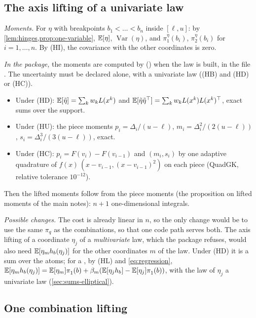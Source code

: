 \documentclass[11pt,a4paper]{article}
\numberwithin{equation}{section}
\newcommand{\hinge}[1]{h_{#1}}          %
\newcommand{\slt}[2]{\pi^{#1}_{#2}}      %
\newcommand{\Var}{\operatorname{Var}}
\newcommand{\Hyp}[1]{\textup{(H#1)}}    %
\begin{document}
\subsection{The axis lifting of a univariate law}
\label{sec:axis}

\emph{Moments.} For $\eta$ with breakpoints $b_1 < \dots < b_n$ inside $[\ell, u]$:
by \cref{lem:hinges,prop:one-variable}, $\mathbb{E}[\eta]$, $\Var(\eta)$, and $\slt\eta1(b_i)$, $\slt\eta2(b_i)$ for $i = 1, \dots, n$.
By \Hyp{I}, the covariance with the other coordinates is zero.

\emph{In the package,} the moments are computed by  ()
when the law  is built, in the file
.
The uncertainty must be declared alone, with a univariate law (\Hyp{B} and \Hyp{D} or \Hyp{C}).
\begin{itemize}[nosep]
\item Under \Hyp{D}: $\mathbb{E}[\tilde\eta] = \sum_k w_kL(x^k)$ and $\mathbb{E}[\tilde\eta\tilde\eta^\top] = \sum_k w_kL(x^k)L(x^k)^\top$, exact sums over the support.
\item Under \Hyp{U}: the piece moments $p_i = \Delta_i/(u - \ell)$, $m_i = \Delta_i^2/(2(u - \ell))$, $s_i = \Delta_i^3/(3(u - \ell))$, exact.
\item Under \Hyp{C}: $p_i = F(v_i) - F(v_{i-1})$ and $(m_i, s_i)$ by one adaptive quadrature of $f(x)\,(x - v_{i-1}, (x - v_{i-1})^2)$ on each piece (QuadGK, relative tolerance $10^{-12}$).
\end{itemize}
Then the lifted moments follow from the piece moments (the proposition on lifted moments of the main notes): $n + 1$ one-dimensional integrals.

\emph{Possible changes.} The cost is already linear in $n$, so the only change would be to use the same $\slt{}q$ as the combinations, so that one code path serves both.
The axis lifting of a coordinate $\eta_j$ of a \emph{multivariate} law, which the package refuses, would also need $\E[\eta_m\hinge b(\eta_j)]$ for the other coordinates $m$ of the law.
Under \Hyp{D} it is a sum over the atoms; for a , by \Hyp{L} and \eqref{eq:regression},
$\E[\eta_m\hinge b(\eta_j)] = \E[\eta_m]\slt{}1(b) + \beta_m(\E[\eta_j\hinge b] - \E[\eta_j]\slt{}1(b))$,
with the law of $\eta_j$ a univariate law (\cref{sec:sums-elliptical}).

\subsection{One combination lifting}
\label{sec:one-combination}
\end{document}
